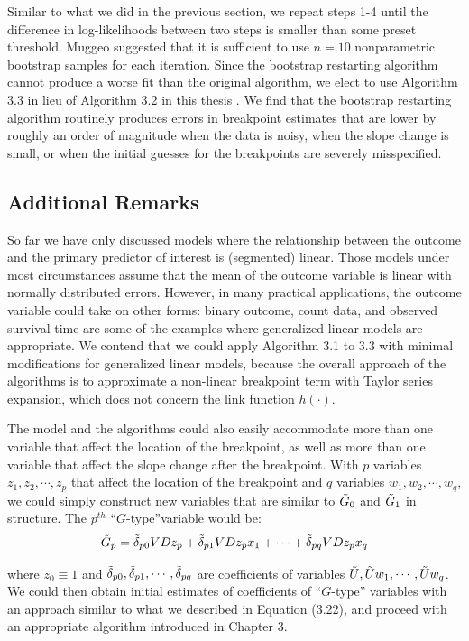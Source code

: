 \documentclass [12pt, proquest] {uwthesis}[2016/11/22]
\begin{document}
Similar to what we did in the previous section, we repeat steps 1-4 until the difference in log-likelihoods between two steps is smaller than some preset threshold. Muggeo suggested that it is sufficient to use $n = 10$ nonparametric bootstrap samples for each iteration. Since the bootstrap restarting algorithm cannot produce a worse fit than the original algorithm, we elect to use Algorithm 3.3 in lieu of Algorithm 3.2 in this thesis \cite{SW2001}. We find that the bootstrap restarting algorithm routinely produces errors in breakpoint estimates that are lower by roughly an order of magnitude when the data is noisy, when the slope change is small, or when the initial guesses for the breakpoints are severely misspecified.

\subsection{Additional Remarks}
So far we have only discussed models where the relationship between the outcome and the primary predictor of interest is (segmented) linear. Those models under most circumstances assume that the mean of the outcome variable is linear with normally distributed errors. However, in many practical applications, the outcome variable could take on other forms: binary outcome, count data, and observed survival time are some of the examples where generalized linear models are appropriate. We contend that we could apply Algorithm 3.1 to 3.3 with minimal modifications for generalized linear models, because the overall approach of the algorithms is to approximate a non-linear breakpoint term with Taylor series expansion, which does not concern the link function $h(\cdot)$.

The model and the algorithms could also easily accommodate more than one variable that affect the location of the breakpoint, as well as more than one variable that affect the slope change after the breakpoint. With $p$ variables $z_1, z_2, \cdots, z_p$ that affect the location of the breakpoint and $q$ variables $w_1, w_2, \cdots, w_q$, we could simply construct new variables that are similar to $\Tilde{G}_0$ and $\Tilde{G}_1$ in structure. The $p^{th}$ ``$G$-type''variable would be:
\begin{align}
    \Tilde{G}_p = \Tilde{\delta}_{p0} VDz_p + \Tilde{\delta}_{p1} VD z_p x_1 + \cdots + \Tilde{\delta}_{pq} VD z_p x_q
\end{align}

where $z_0 \equiv 1$ and $\Tilde{\delta}_{p0}, \Tilde{\delta}_{p1}, \cdots, \Tilde{\delta}_{pq}$ are coefficients of variables $\Tilde{U}, \Tilde{U}w_1, \cdots, \Tilde{U}w_q$. We could then obtain initial estimates of coefficients of ``$G$-type'' variables with an approach similar to what we described in Equation (3.22), and proceed with an appropriate algorithm introduced in Chapter 3.
\end{document}
